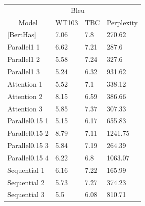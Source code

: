 \documentclass[10pt,twocolumn,letterpaper]{article}
\begin{document}
\begin{table}[]
\begin{tabular}{llll}
\hline
\multicolumn{1}{c}{} & \multicolumn{2}{c}{Bleu} & \multicolumn{1}{c}{\multirow{}{}{}} \\ \cline{2-3}
\multicolumn{1}{c}{\multirow{}{}{Model}}   & WT103       & TBC        & \multicolumn{1}{c}{\multirow{}{}{Perplexity}}                                \\ \hline
{[}BertHas{]}                              & 7.06        & 7.8        & 270.62                                                \\
Parallel1 1                                & 6.62        & 7.21       & 287.6                                                \\
Parallel1 2                                & 5.58        & 7.24       & 327.6                                                \\
Parallel1 3                                & 5.24        & 6.32       & 931.62                                               \\
Attention 1                                & 5.52        & 7.1        & 338.12                                                  \\
Attention 2                                & 8.15        & 6.59       & 386.66                                              \\
Attention 3                                & 5.85        & 7.37       & 307.33                                                 \\
Parallel0.15 1                             & 5.15            & 6.17           & 655.83                                                \\
Parallel0.15 2                             & 8.79            & 7.11           & 1241.75                                                 \\
Parallel0.15 3                             & 5.84            & 7.19           & 264.39                                                \\
Parallel0.15 4                             & 6.22            & 6.8           &  1063.07                                              \\
Sequential 1                               & 6.16            & 7.22           & 165.99                                                \\
Sequential 2                               & 5.73            & 7.27           & 374.23                                                 \\
Sequential 3                               & 5.5            &  6.08          &  810.71                                               \\ \hline
\end{tabular}
\end{table}
\end{document}
